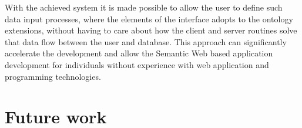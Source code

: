 With the achieved system it is made possible to allow the user to define such data input processes, where the elements of the interface adopts to the ontology extensions, without having to care about how the client and server routines solve that data flow between the user and database. This approach can significantly accelerate the development and allow the Semantic Web based application development for individuals without experience with web application and programming technologies.





\section{Future work}


